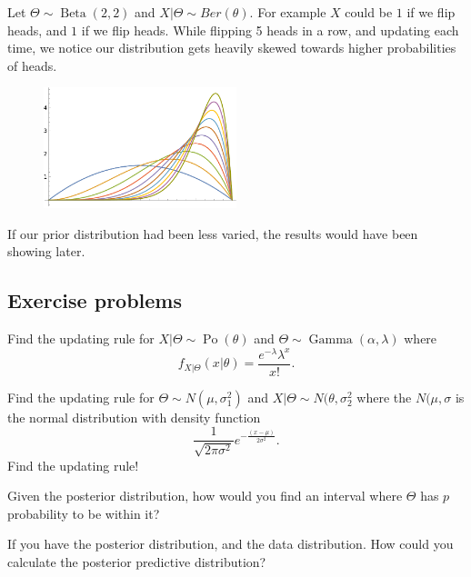\begin{example}
	Let \(\Theta \sim \operatorname{Beta} (2, 2)\) and \(X|\Theta \sim Ber(\theta)\). For example \(X\) could be \(1\) if we flip heads, and \(1\) if we flip heads. While flipping 5 heads in a row, and updating each time, we notice our distribution gets heavily skewed towards higher probabilities of heads.
	\begin{figure}[H]
		\centering
		\includegraphics[width=0.5\textwidth]{beta.pdf}
	\end{figure}
	If our prior distribution had been less varied, the results would have been showing later.
\end{example}

\subsection{Exercise problems}

\begin{problem}
	Find the updating rule for \(X | \Theta  \sim \operatorname{Po} (\theta)\) and \(\Theta \sim \operatorname{Gamma} (\alpha, \lambda )\) where
	\[
		f _{X|\Theta }(x|\theta ) = \frac{e ^{- \lambda} \lambda ^x}{x!}.
	\]
\end{problem}

\begin{problem}
	Find the updating rule for \(\Theta \sim N(\mu , \sigma _1^2)\) and \(X | \Theta \sim N(\theta , \sigma _2^2 \) where the \(N(\mu , \sigma \) is the normal distribution with density function
	\[
		\frac{1}{\sqrt{2 \pi \sigma ^2} } e ^{- \frac{(x-\mu) }{2 \sigma ^2} }.
	\]
	Find the updating rule!
\end{problem}

\begin{problem}
	Given the posterior distribution, how would you find an interval where \(\Theta \) has \(p\) probability to be within it?
\end{problem}

\begin{problem}
	If you have the posterior distribution, and the data distribution. How could you calculate the posterior predictive distribution?
\end{problem}
